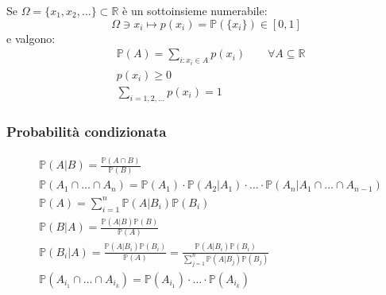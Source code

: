 \begin{definition}
	Se $\Omega=\{x_1,x_2,\ldots\} \subset \mathbb{R}$ è un sottoinsieme numerabile:
	\begin{equation}
		\Omega \ni x_i \mapsto p(x_i) = \mathbb{P}(\{x_i\}) \in [0,1]
	\end{equation}
	e valgono:
	\begin{align}
		& \mathbb{P}(A) = \sum_{i : x_i \in A} p(x_i) \quad\quad \forall A \subseteq \mathbb{R} \\
		& p(x_i) \geq 0 \\
		& \sum_{i=1,2,\ldots} p(x_i) = 1
	\end{align}
\end{definition}

\subsubsection{Probabilità condizionata}
\begin{align}
	& \mathbb{P}(A \vert B) = \frac{\mathbb{P}(A \cap B)}{\mathbb{P}(B)} \tag{Probabilità condizionata} \\
	& \mathbb{P}(A_1 \cap \ldots \cap A_n) = \mathbb{P}(A_1) \cdot \mathbb{P}(A_2 \vert A_1) \cdot \ldots \cdot \mathbb{P}(A_n \vert A_1 \cap \ldots \cap A_{n-1}) \tag{Condizionamento ripetuto} \\
	& \mathbb{P}(A) = \sum_{i=1}^{n} \mathbb{P}(A \vert B_i)\mathbb{P}(B_i) \tag{Formula di fattorizzazione} \\
	& \mathbb{P}(B \vert A) = \frac{\mathbb{P}(A \vert B)\mathbb{P}(B)}{\mathbb{P}(A)} \tag{Formula di Bayes} \\
	& \mathbb{P}(B_i \vert A) = \frac{\mathbb{P}(A \vert B_i)\mathbb{P}(B_i)}{\mathbb{P}(A)} = \frac{\mathbb{P}(A \vert B_i) \mathbb{P}(B_i)}{\sum_{j=1}^{n}\mathbb{P}(A \vert B_j)\mathbb{P}(B_j)} \tag{Formula di Bayes - Sistema di alternative} \\
	& \mathbb{P}(A_{i_1} \cap \ldots \cap A_{i_k}) = \mathbb{P}(A_{i_1}) \cdot \ldots \cdot \mathbb{P}(A_{i_k}) \tag{Eventi indipendenti}
\end{align}

\newpage

